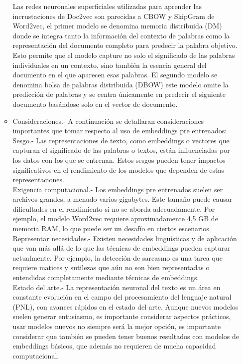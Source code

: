 \begin{itemize}
\begin{itemize}
Las redes neuronales superficiales utilizadas para aprender las incrustaciones de Doc2vec son parecidas a CBOW y SkipGram de Word2vec, el primer modelo se denomina memoria distribuida (DM) donde se integra tanto la información del contexto de palabras como la representación del documento completo para predecir la palabra objetivo. Esto permite que el modelo capture no solo el significado de las palabras individuales en un contexto, sino también la esencia general del documento en el que aparecen esas palabras. El segundo modelo se denomina bolsa de palabras distribuida (DBOW) este modelo omite la predicción de palabras y se centra únicamente en predecir el siguiente documento basándose solo en el vector de documento.
	
	\item Consideraciones.- A continuación se detallaran consideraciones importantes que tomar respecto al uso de embeddings pre entrenados:\\
Sesgo.-  Las representaciones de texto, como embeddings o vectores que capturan el significado de las palabras o textos, están influenciadas por los datos con los que se entrenan. Estos sesgos pueden tener impactos significativos en el rendimiento de los modelos que dependen de estas representaciones.\\

Exigencia computacional.- Los embeddings pre entrenados suelen ser archivos grandes, a menudo varios gigabytes. Este tamaño puede causar dificultades en el rendimiento si no se aborda adecuadamente. Por ejemplo, el modelo Word2vec requiere aproximadamente 4,5 GB de memoria RAM, lo que puede ser un desafío en ciertos escenarios.
\\
Representar necesidades.- Existen necesidades lingüísticas y de aplicación que van más allá de lo que las técnicas de embeddings pueden capturar actualmente. Por ejemplo, la detección de sarcasmo es una tarea que requiere matices y sutilezas que aún no son bien representadas o entendidas completamente mediante técnicas de embeddings.\\

Estado del arte.- La representación neuronal del texto es un área en constante evolución en el campo del procesamiento del lenguaje natural (PNL), con avances rápidos en el estado del arte. Aunque nuevos modelos suelen generar entusiasmo, es importante considerar aspectos prácticos, usar modelos nuevos no siempre será la mejor opción, es importante considerar que también se pueden tener buenos resultados con modelos de embeddings básicos, que además no requieren de mucha capacidad computacional. 

\end{itemize}
\end{itemize}



